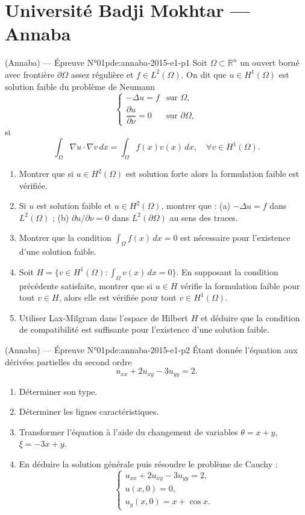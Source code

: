 \section{Université Badji Mokhtar --- Annaba}
\begin{problem}{(Annaba) — Épreuve N°01}{pde:annaba-2015-e1-p1}
Soit $\Omega\subset\mathbb{R}^n$ un ouvert borné avec frontière $\partial\Omega$ assez régulière et $f\in L^2(\Omega)$. On dit que $u\in H^1(\Omega)$ est solution faible du problème de Neumann
$$\begin{cases}-\Delta u=f & \text{sur } \Omega,\\ \dfrac{\partial u}{\partial\nu}=0 & \text{sur } \partial\Omega,\end{cases}$$
si
$$\int_\Omega\nabla u\cdot\nabla v\,dx=\int_\Omega f(x)v(x)\,dx,\quad\forall v\in H^1(\Omega).$$
\begin{enumerate}\item Montrer que si $u\in H^2(\Omega)$ est solution forte alors la formulation faible est vérifiée.\item Si $u$ est solution faible et $u\in H^2(\Omega)$, montrer que : (a) $-\Delta u=f$ dans $L^2(\Omega)$ ; (b) $\partial u/\partial\nu=0$ dans $L^2(\partial\Omega)$ au sens des traces.\item Montrer que la condition $\int_\Omega f(x)\,dx=0$ est nécessaire pour l'existence d'une solution faible.\item Soit $H=\{v\in H^1(\Omega) : \int_\Omega v(x)\,dx=0\}$. En supposant la condition précédente satisfaite, montrer que si $u\in H$ vérifie la formulation faible pour tout $v\in H$, alors elle est vérifiée pour tout $v\in H^1(\Omega)$.\item Utiliser Lax-Milgram dans l'espace de Hilbert $H$ et déduire que la condition de compatibilité est suffisante pour l'existence d'une solution faible.\end{enumerate}
\end{problem}
\newpage
\begin{problem}{(Annaba) — Épreuve N°01}{pde:annaba-2015-e1-p2}
Étant donnée l'équation aux dérivées partielles du second ordre
$$u_{xx}+2u_{xy}-3u_{yy}=2.$$
\begin{enumerate}\item Déterminer son type.\item Déterminer les lignes caractéristiques.\item Transformer l'équation à l'aide du changement de variables $\theta=x+y$, $\xi=-3x+y$.\item En déduire la solution générale puis résoudre le problème de Cauchy :
$$\begin{cases}u_{xx}+2u_{xy}-3u_{yy}=2,\\ u(x,0)=0,\\ u_y(x,0)=x+\cos x.\end{cases}$$\end{enumerate}
\end{problem}
\newpage

